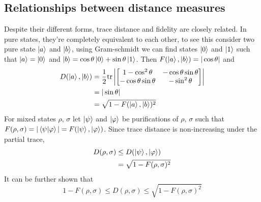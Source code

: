 \subsection{Relationships between distance measures}
Despite their different forms, trace distance and fidelity are closely related. In pure states, they're completely equivalent to each other, to see this consider two pure state $\ket{a}$ and $\ket{b}$, using Gram-schmidt we can find states $\ket{0}$ and $\ket{1}$ such that $\ket{a} = \ket{0}$ and $\ket{b}=\cos{\theta}\ket{0} + \sin{\theta}\ket{1}$. Then $F(\ket{a}, \ket{b}) = |\cos{\theta} |$ and
\begin{align}
    D(\ket{a}, \ket{b}) &= \frac{1}{2}\text{tr} \left|
     \begin{bmatrix}
         1-\cos^2\theta & -\cos{\theta}\sin{\theta} \\
         -\cos{\theta}\sin{\theta} & -\sin^2\theta
     \end{bmatrix} 
    \right|
    \\
    &= |\sin{\theta}| \\
    &= \sqrt{1-F(\ket{a}, \ket{b})^2}    
\end{align}
For mixed states $\rho$, $\sigma$ let $\ket{\psi}$ and $\ket{\varphi}$ be purifications of $\rho$, $\sigma$ such that $F(\rho, \sigma) = |\braket{\psi | \varphi}| = F(\ket{\psi}, \ket{\varphi})$. Since trace distance is non-increasing under the partial trace,
\begin{align}
    D(\rho, \sigma) &\leq D(\ket{\psi}, \ket{\varphi}) \\ 
    &= \sqrt{1-F(\rho, \sigma)^2}
\end{align}
It can be further shown that
\begin{equation}
    1-F(\rho, \sigma) \leq D(\rho, \sigma) \leq \sqrt{1-F(\rho, \sigma)^2}
\end{equation}

